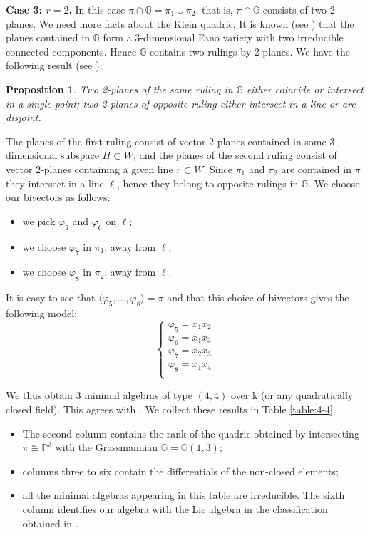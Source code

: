 \documentclass[10pt,reqno]{amsart}
\newcommand{\la}{\langle}
\newcommand{\ra}{\rangle}
\newcommand{\GG}{\mathbb{G}}
\newcommand{\PP}{\mathbb P}
\newcommand{\f}{\varphi}
\newcommand{\kk}{\mathrm{k}}
\newtheorem{proposition}[theorem]{Proposition}
\theoremstyle{definition}
\begin{document}
\noindent \textbf{Case 3: $r=2$.} In this case $\pi \cap \GG=\pi_1\cup\pi_2$, that is, $\pi \cap \GG$ consists of two 2-planes. We need more facts about the Klein quadric. It is known (see \cite[Example 22.7]{Harris}) that the planes contained in $\GG$ form a 3-dimensional Fano variety with two irreducible connected components. Hence $\GG$ contains two rulings by 2-planes. We have the following result (see \cite[Proposition 22.8]{Harris}):

\begin{proposition}
Two 2-planes of the same ruling in $\GG$ either coincide or intersect in a single point; two 2-planes of opposite ruling either intersect in a line or are disjoint.
\end{proposition}

\noindent The planes of the first ruling consist of vector $2$-planes contained in some 3-dimensional subspace $H\subset W$, and the planes of the second ruling consist of vector $2$-planes containing a given line $r\subset W$. Since $\pi_1$ and $\pi_2$ are contained in $\pi$ they intersect in a line $\ell$, hence they belong to opposite rulings in $\GG$. We choose our bivectors as follows:
\begin{itemize}
    \item we pick $\f_5$ and $\f_6$ on $\ell$;
    \item we choose $\f_7$ in $\pi_1$, away from $\ell$;
    \item we choose $\f_8$ in $\pi_2$, away from $\ell$.
\end{itemize}
It is easy to see that $\la\f_5,\ldots,\f_8\ra=\pi$ and that this choice of bivectors gives the following model:
\[
\begin{cases}
\f_5=x_1x_2 \\
\f_6=x_1x_3 \\
\f_7=x_2x_3 \\
\f_8=x_1x_4 \\
\end{cases}
\]



\noindent We thus obtain 3 minimal algebras of type $(4,4)$ over $\kk$ (or any quadratically closed field). This agrees with \cite[Corollary 7.5]{Stroppel}. We collect these results in Table \ref{table:4-4}.
\begin{itemize}
    \item The second column contains the rank of the quadric obtained by intersecting $\pi\cong\PP^3$ with the Grassmannian $\GG=\GG(1,3)$;
    \item columns three to six contain the differentials of the non-closed elements;
    \item all the minimal algebras appearing in this table are irreducible. The sixth column identifies our algebra with the Lie algebra in the classification obtained in \cite{Yan}.
\end{itemize}
\end{document}

